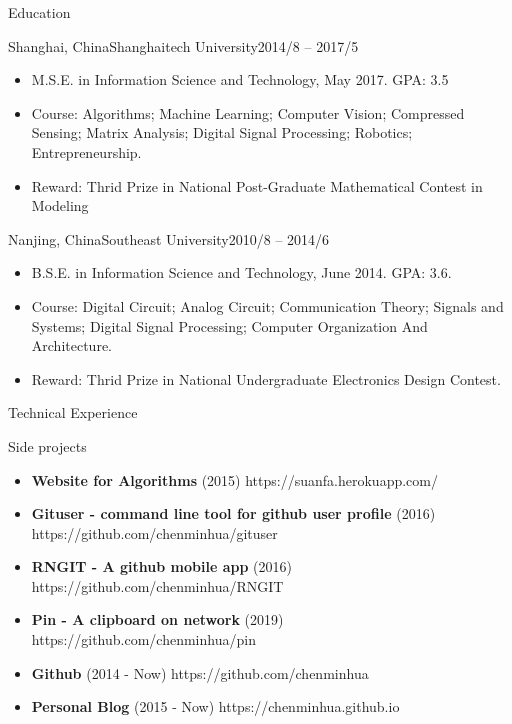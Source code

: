 \documentclass[]{minhuacv}
\begin{document}
	\begin{cvsection}{Education}
		\begin{cvsubsection}{Shanghai, China}{Shanghaitech University}{2014/8 -- 2017/5}
			\begin{itemize}
				\item M.S.E. in Information Science and Technology, May 2017. GPA: 3.5
				\item Course: Algorithms; Machine Learning; Computer Vision; Compressed Sensing; Matrix Analysis; Digital Signal Processing; Robotics; Entrepreneurship.
				\item Reward: Thrid Prize in National Post-Graduate Mathematical Contest in Modeling
			\end{itemize}
		\end{cvsubsection}
		\begin{cvsubsection}{Nanjing, China}{Southeast University}{2010/8 -- 2014/6}
			\begin{itemize}
				\item B.S.E. in Information Science and Technology, June 2014. GPA: 3.6.
				\item Course: Digital Circuit; Analog Circuit; Communication Theory; Signals and Systems; Digital Signal Processing; Computer Organization And Architecture.
				\item Reward: Thrid Prize in National Undergraduate Electronics Design Contest.
			\end{itemize}
		\end{cvsubsection}
	\end{cvsection}
	
	\begin{cvsection}{Technical Experience}
		\begin{cvsubsection}{Side projects}{}{}
			\begin{itemize}
				\item \textbf{Website for Algorithms} (2015) https://suanfa.herokuapp.com/
				\item \textbf{Gituser - command line tool for github user profile} (2016) https://github.com/chenminhua/gituser 
				\item \textbf{RNGIT - A github mobile app} (2016) https://github.com/chenminhua/RNGIT
				\item \textbf{Pin - A clipboard on network} (2019) https://github.com/chenminhua/pin
				\item \textbf{Github} (2014 - Now) https://github.com/chenminhua
				\item \textbf{Personal Blog} (2015 - Now) https://chenminhua.github.io
			\end{itemize}
		\end{cvsubsection}
	\end{cvsection}
	
\end{document}
